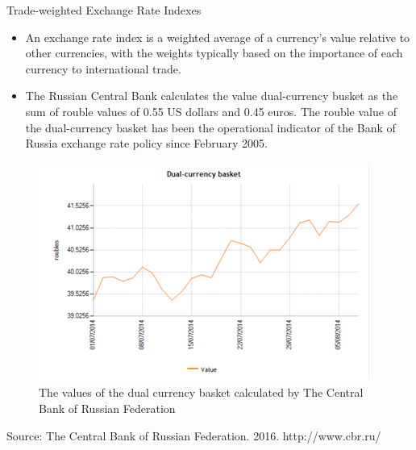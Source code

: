 \documentclass[international_finance_p1.tex]{subfiles}
\begin{document}
\begin{frame}{Trade-weighted Exchange Rate Indexes}
\begin{itemize}[<+->]
\item
An exchange rate index is a weighted average of a currency’s value relative to other currencies, with the weights typically based on the importance of each currency to international trade.
\item
The Russian Central Bank calculates the value dual-currency busket as the sum of rouble values of 0.55 US dollars and 0.45 euros. The rouble value of the dual-currency basket has been the operational indicator of the Bank of Russia exchange rate policy since February 2005.
\end{itemize}
\end{frame}
\begin{frame}
\begin{figure}
\centering
\includegraphics[scale=0.7]{img/dual_currency_busket}
\caption{The values of the dual currency basket calculated by The Central Bank of Russian Federation}
\end{figure}
Source: The Central Bank of Russian Federation. 2016. http://www.cbr.ru/
\end{frame}
\end{document}
